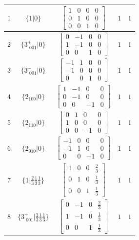 \documentclass[fleqn,8pt]{jsarticle}
\begin{document}
\begin{longtable}{ccccc}
$ 1 $ & $ \{1|0\} $ & $ \begin{bmatrix} 1 & 0 & 0 & 0 \\ 0 & 1 & 0 & 0 \\ 0 & 0 & 1 & 0 \end{bmatrix} $ & $ 1 $ & $ 1 $ \\ \hline
$ 2 $ & $ \{3^{+}_{\,\,001}|0\} $ & $ \begin{bmatrix} 0 & -1 & 0 & 0 \\ 1 & -1 & 0 & 0 \\ 0 & 0 & 1 & 0 \end{bmatrix} $ & $ 1 $ & $ 1 $ \\ \hline
$ 3 $ & $ \{3^{-}_{\,\,001}|0\} $ & $ \begin{bmatrix} -1 & 1 & 0 & 0 \\ -1 & 0 & 0 & 0 \\ 0 & 0 & 1 & 0 \end{bmatrix} $ & $ 1 $ & $ 1 $ \\ \hline
$ 4 $ & $ \{2{}_{100}|0\} $ & $ \begin{bmatrix} 1 & -1 & 0 & 0 \\ 0 & -1 & 0 & 0 \\ 0 & 0 & -1 & 0 \end{bmatrix} $ & $ 1 $ & $ 1 $ \\ \hline
$ 5 $ & $ \{2{}_{110}|0\} $ & $ \begin{bmatrix} 0 & 1 & 0 & 0 \\ 1 & 0 & 0 & 0 \\ 0 & 0 & -1 & 0 \end{bmatrix} $ & $ 1 $ & $ 1 $ \\ \hline
$ 6 $ & $ \{2{}_{010}|0\} $ & $ \begin{bmatrix} -1 & 0 & 0 & 0 \\ -1 & 1 & 0 & 0 \\ 0 & 0 & -1 & 0 \end{bmatrix} $ & $ 1 $ & $ 1 $ \\ \hline
$ 7 $ & $ \{1|\frac{2}{3} \frac{1}{3} \frac{1}{3}\} $ & $ \begin{bmatrix} 1 & 0 & 0 & \frac{2}{3} \\ 0 & 1 & 0 & \frac{1}{3} \\ 0 & 0 & 1 & \frac{1}{3} \end{bmatrix} $ & $ 1 $ & $ 1 $ \\ \hline
$ 8 $ & $ \{3^{+}_{\,\,001}|\frac{2}{3} \frac{1}{3} \frac{1}{3}\} $ & $ \begin{bmatrix} 0 & -1 & 0 & \frac{2}{3} \\ 1 & -1 & 0 & \frac{1}{3} \\ 0 & 0 & 1 & \frac{1}{3} \end{bmatrix} $ & $ 1 $ & $ 1 $ \\ \hline

\end{longtable}
\end{document}
